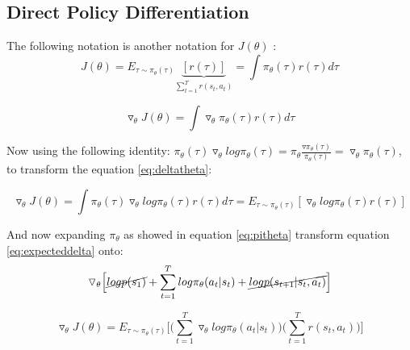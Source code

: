 \documentclass[]{article}
\begin{document}
\subsection*{Direct Policy Differentiation}
\label{sub:Direct Policy Differentation}

The following notation is another notation for $J(\theta)$ :
\begin{equation}
    \label{eq:jtheta}
    J(\theta) = E_{\tau \sim \pi_{\theta}(\tau)}\underbrace{[r(\tau)]}_{\sum_{t=1}^{T}r(s_{t},a_{t})} = \int
    \pi_{\theta}(\tau) r(\tau) d\tau
\end{equation}

\begin{equation}
    \label{eq:deltatheta}
    \triangledown_{\theta}J(\theta)= \int  \triangledown_{\theta}\pi_{\theta}(\tau) r(\tau) d\tau
\end{equation}

Now using the following identity: $\pi_{\theta}(\tau) \triangledown_{\theta}log\pi_{\theta}(\tau) =
\pi_{\theta}\frac{\triangledown \pi_{\theta}(\tau)}{\pi_{\theta}(\tau)} = \triangledown_{\theta} \pi_{\theta}(\tau)$,
to transform the equation \eqref{eq:deltatheta}:

\begin{equation}
    \label{eq:expecteddelta}
    \triangledown_{\theta}J(\theta) = \int
    \pi_{\theta}(\tau)\triangledown_{\theta}log\pi_{\theta}(\tau)r(\tau)d\tau = E_{\tau \sim
    \pi_{\theta}(\tau)}[\triangledown_{\theta}log\pi_{\theta}(\tau)r(\tau)]
\end{equation}

\par And now expanding $\pi_{\theta}$ as showed in equation \eqref{eq:pitheta} transform equation
\eqref{eq:expecteddelta} onto: 
\begin{equation}
    \triangledown_{\theta} \Big[ \cancel{logp(s_1)} + \sum_{t=1}^{T}log\pi_{\theta}(a_t|s_t) +
    \cancel{logp(s_{t+1}|s_t,a_t) }\Big]
\end{equation}

\begin{equation}
    \label{eq:thetajota}
    \triangledown_{\theta}J(\theta) = E_{\tau \sim \pi_{\theta}(\tau)} \bigg[
    \Big(\sum_{t=1}^{T}\triangledown_{\theta}log\pi_{\theta}(a_t|s_t)\Big)\Big(\sum_{t=1}^{T}r(s_t,a_t)\Big) \bigg]
\end{equation}
\end{document}
